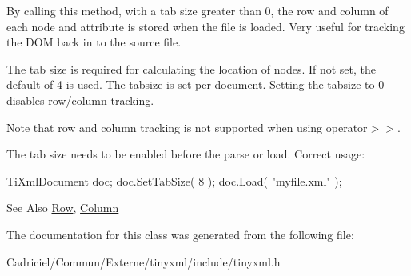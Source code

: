 By calling this method, with a tab size greater than 0, the row and column of each node and attribute is stored when the file is loaded. Very useful for tracking the D\-O\-M back in to the source file.

The tab size is required for calculating the location of nodes. If not set, the default of 4 is used. The tabsize is set per document. Setting the tabsize to 0 disables row/column tracking.

Note that row and column tracking is not supported when using operator$>$$>$.

The tab size needs to be enabled before the parse or load. Correct usage\-: \begin{DoxyVerb}TiXmlDocument doc;
doc.SetTabSize( 8 );
doc.Load( "myfile.xml" );
\end{DoxyVerb}


\begin{DoxySeeAlso}{See Also}
\hyperlink{class_ti_xml_base_a024bceb070188df92c2a8d8852dd0853}{Row}, \hyperlink{class_ti_xml_base_ab54bfb9b70fe6dd276e7b279cab7f003}{Column} 
\end{DoxySeeAlso}


The documentation for this class was generated from the following file\-:\begin{DoxyCompactItemize}
\item 
Cadriciel/\-Commun/\-Externe/tinyxml/include/tinyxml.\-h\end{DoxyCompactItemize}
